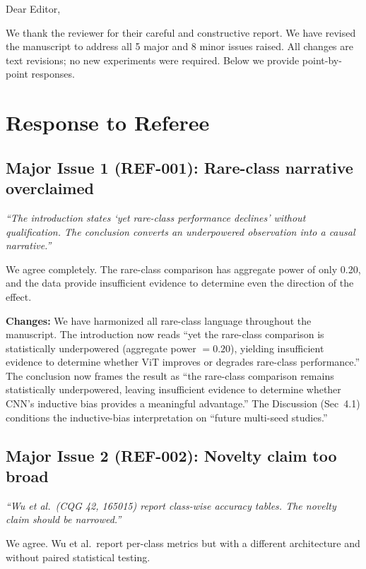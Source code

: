 \documentclass[12pt]{article}
\begin{document}
\noindent Dear Editor,

\medskip

We thank the reviewer for their careful and constructive report. We have revised the manuscript to address all 5 major and 8 minor issues raised. All changes are text revisions; no new experiments were required. Below we provide point-by-point responses.

\bigskip

\section*{Response to Referee}

\subsection*{Major Issue 1 (REF-001): Rare-class narrative overclaimed}

\textit{``The introduction states `yet rare-class performance declines' without qualification. The conclusion converts an underpowered observation into a causal narrative.''}

\medskip

We agree completely. The rare-class comparison has aggregate power of only 0.20, and the data provide insufficient evidence to determine even the direction of the effect.

\textbf{Changes:} We have harmonized all rare-class language throughout the manuscript. The introduction now reads ``yet the rare-class comparison is statistically underpowered (aggregate power $= 0.20$), yielding insufficient evidence to determine whether ViT improves or degrades rare-class performance.'' The conclusion now frames the result as ``the rare-class comparison remains statistically underpowered, leaving insufficient evidence to determine whether CNN's inductive bias provides a meaningful advantage.'' The Discussion (Sec~4.1) conditions the inductive-bias interpretation on ``future multi-seed studies.''

\subsection*{Major Issue 2 (REF-002): Novelty claim too broad}

\textit{``Wu et al.\ (CQG 42, 165015) report class-wise accuracy tables. The novelty claim should be narrowed.''}

\medskip

We agree. Wu et al.\ report per-class metrics but with a different architecture and without paired statistical testing.
\end{document}
